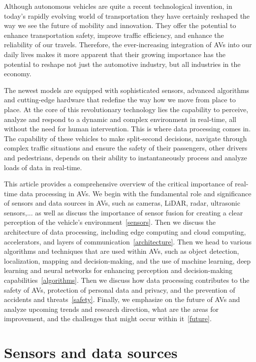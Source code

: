 \documentclass[10pt,oneside,english,a4paper]{article}
\begin{document}
\indent Although autonomous vehicles are quite a recent technological invention, in today's rapidly evolving world of transportation they have certainly reshaped the way we see the future of mobility and innovation. They offer the potential to enhance transportation safety, improve traffic efficiency, and enhance the reliability of our travels. Therefore, the ever-increasing integration of AVs into our daily lives makes it more apparent that their growing importance has the potential to reshape not just the automotive industry, but all industries in the economy. 
\par The newest models are equipped with sophisticated sensors, advanced algorithms and cutting-edge hardware that redefine the way how we move from place to place. At the core of this revolutionary technology lies the capability to perceive, analyze and respond to a dynamic and complex environment in real-time, all without the need for human intervention. This is where data processing comes in. The capability of these vehicles to make split-second decisions, navigate through complex traffic situations and ensure the safety of their passengers, other drivers and pedestrians, depends on their ability to instantaneously process and analyze loads of data in real-time.
\par This article provides a comprehensive overview of the critical importance of real-time data processing in AVs. We begin with the fundamental role and significance of sensors and data sources in AVs, such as cameras, LiDAR, radar, ultrasonic sensors,... as well as discuss the importance of sensor fusion for creating a clear perception of the vehicle's environment~\eqref{sensors}. Then we discuss the architecture of data processing, including edge computing and cloud computing, accelerators, and layers of communication~\eqref{architecture}. Then we head to various algorithms and techniques that are used within AVs, such as object detection, localization, mapping and decision-making, and the use of machine learning, deep learning and neural networks for enhancing perception and decision-making capabilities~\eqref{algorithms}. Then we discuss how data processing contributes to the safety of AVs, protection of personal data and privacy, and the prevention of accidents and threats~\eqref{safety}. Finally, we emphasize on the future of AVs and analyze upcoming trends and research direction, what are the areas for improvement, and the challenges that might occur within it~\eqref{future}.


\section{Sensors and data sources} \label{sensors}
\end{document}
